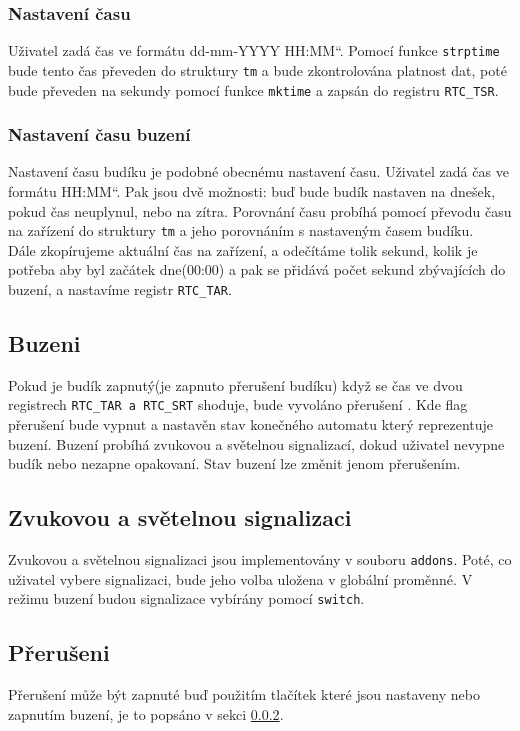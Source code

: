 \documentclass[a4paper,11pt]{article}
\newcommand{\czuv}[1]{\quotedblbase #1\textquotedblleft}
\begin{document}
\subsubsection{Nastavení času}
Uživatel zadá čas ve formátu \czuv{dd-mm-YYYY HH:MM}. Pomocí funkce \texttt{strptime} bude tento čas převeden do struktury \texttt{tm} a  bude zkontrolována platnost dat, poté bude převeden na sekundy pomocí funkce \texttt{mktime} a zapsán do registru \texttt{RTC\_TSR}.
\subsubsection{Nastavení času buzení}
\label{sec:zapbuz}
Nastavení času budíku je podobné obecnému nastavení času. Uživatel zadá čas ve formátu \czuv{HH:MM}. Pak jsou dvě možnosti: buď bude budík nastaven na dnešek, pokud čas neuplynul, nebo na zítra. Porovnání času probíhá pomocí převodu času na zařízení do struktury \texttt{tm} a jeho porovnáním s nastaveným časem budíku.\\
Dále zkopírujeme aktuální čas na zařízení, a odečítáme tolik sekund, kolik je potřeba aby byl začátek dne(00:00) a pak se přidává počet sekund zbývajících do buzení, a nastavíme registr \texttt{RTC\_TAR}.

\subsection{Buzeni}
Pokud je budík zapnutý(je zapnuto přerušení budíku) když se čas ve dvou registrech \texttt{RTC\_TAR a RTC\_SRT} shoduje, bude vyvoláno přerušení . Kde flag přerušení bude vypnut a nastavěn stav konečného automatu který reprezentuje buzení. Buzení probíhá zvukovou a světelnou signalizací, dokud uživatel nevypne budík nebo nezapne opakovaní. Stav buzení lze změnit jenom přerušením.

\subsection{Zvukovou a světelnou signalizaci}
Zvukovou a světelnou signalizaci jsou implementovány v souboru \texttt{addons}. Poté, co uživatel vybere signalizaci, bude jeho volba uložena v globální proměnné. V režimu buzení budou signalizace vybírány pomocí \texttt{switch}.

\subsection{Přerušeni}
Přerušení může být zapnuté buď použitím tlačítek které jsou nastaveny nebo zapnutím buzení, je to popsáno v sekci \ref{sec:zapbuz}. 
\end{document}
